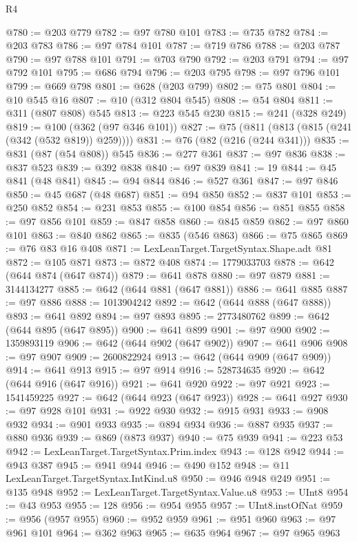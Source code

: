 \begin{lexlean}{R4}
\begin{coremodule}
@780 := @203 @779
@782 := @97 @780 @101
@783 := @735 @782
@784 := @203 @783
@786 := @97 @784 @101
@787 := @719 @786
@788 := @203 @787
@790 := @97 @788 @101
@791 := @703 @790
@792 := @203 @791
@794 := @97 @792 @101
@795 := @686 @794
@796 := @203 @795
@798 := @97 @796 @101
@799 := @669 @798
@801 := @628 (@203 @799)
@802 := @75 @801
@804 := @10 @545 @16
@807 := @10 (@312 @804 @545)
@808 := @54 @804
@811 := @311 (@807 @808) @545
@813 := @223 @545 @230
@815 := @241 (@328 @249)
@819 := @100 (@362 (@97 @346 @101))
@827 := @75 (@811 (@813 (@815 (@241 (@342 (@532 @819)) @259))))
@831 := @76 (@82 (@216 (@244 @341)))
@835 := @831 (@87 (@54 @808)) @545
@836 := @277 @361
@837 := @97 @836
@838 := @837 @523
@839 := @392 @838
@840 := @97 @839
@841 := 19
@844 := @45 @841 (@48 @841)
@845 := @94 @844
@846 := @527 @361
@847 := @97 @846
@850 := @45 @687 (@48 @687)
@851 := @94 @850
@852 := @837 @101
@853 := @250 @852
@854 := @231 @853
@855 := @100 @854
@856 := @851 @855
@858 := @97 @856 @101
@859 := @847 @858
@860 := @845 @859
@862 := @97 @860 @101
@863 := @840 @862
@865 := @835 (@546 @863)
@866 := @75 @865
@869 := @76 @83 @16 @408
@871 := LexLeanTarget.TargetSyntax.Shape.adt @81
@872 := @105 @871
@873 := @872 @408
@874 := 1779033703
@878 := @642 (@644 @874 (@647 @874))
@879 := @641 @878
@880 := @97 @879
@881 := 3144134277
@885 := @642 (@644 @881 (@647 @881))
@886 := @641 @885
@887 := @97 @886
@888 := 1013904242
@892 := @642 (@644 @888 (@647 @888))
@893 := @641 @892
@894 := @97 @893
@895 := 2773480762
@899 := @642 (@644 @895 (@647 @895))
@900 := @641 @899
@901 := @97 @900
@902 := 1359893119
@906 := @642 (@644 @902 (@647 @902))
@907 := @641 @906
@908 := @97 @907
@909 := 2600822924
@913 := @642 (@644 @909 (@647 @909))
@914 := @641 @913
@915 := @97 @914
@916 := 528734635
@920 := @642 (@644 @916 (@647 @916))
@921 := @641 @920
@922 := @97 @921
@923 := 1541459225
@927 := @642 (@644 @923 (@647 @923))
@928 := @641 @927
@930 := @97 @928 @101
@931 := @922 @930
@932 := @915 @931
@933 := @908 @932
@934 := @901 @933
@935 := @894 @934
@936 := @887 @935
@937 := @880 @936
@939 := @869 (@873 @937)
@940 := @75 @939
@941 := @223 @53
@942 := LexLeanTarget.TargetSyntax.Prim.index
@943 := @128 @942
@944 := @943 @387
@945 := @941 @944
@946 := @490 @152
@948 := @11 LexLeanTarget.TargetSyntax.IntKind.u8
@950 := @946 @948 @249
@951 := @135 @948
@952 := LexLeanTarget.TargetSyntax.Value.u8
@953 := UInt8
@954 := @43 @953
@955 := 128
@956 := @954 @955
@957 := UInt8.instOfNat
@959 := @956 (@957 @955)
@960 := @952 @959
@961 := @951 @960
@963 := @97 @961 @101
@964 := @362 @963
@965 := @635 @964
@967 := @97 @965 @963

\end{coremodule}
\end{lexlean}
